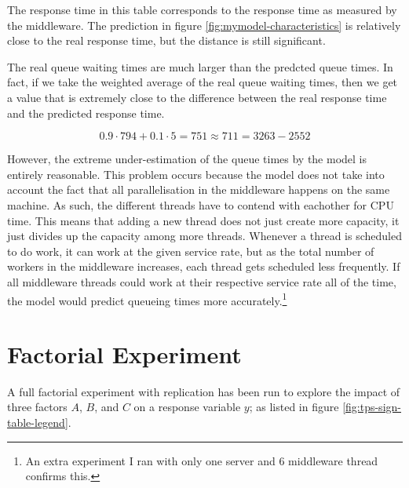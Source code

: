 \documentclass[11pt]{article}
\begin{document}
The response time in this table corresponds to the response time as measured by the middleware.
The prediction in figure \ref{fig:mymodel-characteristics} is relatively close to the real response time, but the distance is still significant.

The real queue waiting times are much larger than the predcted queue times.
In fact, if we take the weighted average of the real queue waiting times, then we get a value that is extremely close to the difference between the real response time and the predicted response time.

\[ 0.9 \cdot 794 + 0.1 \cdot 5 = 751 \approx 711 = 3263 - 2552 \]

However, the extreme under-estimation of the queue times by the model is entirely reasonable.
This problem occurs because the model does not take into account the fact that all parallelisation in the middleware happens on the same machine.
As such, the different threads have to contend with eachother for CPU time.
This means that adding a new thread does not just create more capacity, it just divides up the capacity among more threads.
Whenever a thread is scheduled to do work, it can work at the given service rate, but as the total number of workers in the middleware increases, each thread gets scheduled less frequently.
If all middleware threads could work at their respective service rate all of the time, the model would predict queueing times more accurately.\footnote{An extra experiment I ran with only one server and 6 middleware thread confirms this.}

\section{Factorial Experiment}\label{sec:2k-experiment}



A full factorial experiment with replication has been run to explore the impact of three factors $A$, $B$, and $C$ on a response variable $y$; as listed in figure \ref{fig:tps-sign-table-legend}.
\end{document}
